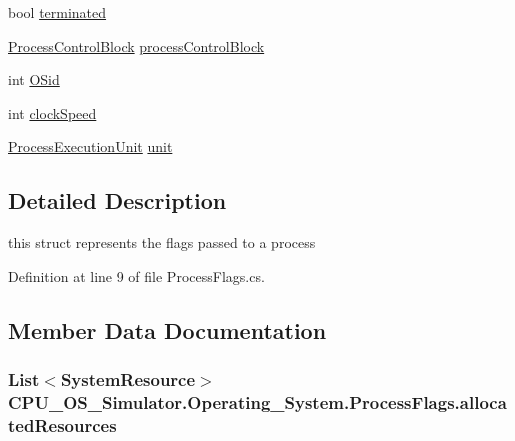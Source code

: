 \begin{DoxyCompactItemize}
\item 
bool \hyperlink{struct_c_p_u___o_s___simulator_1_1_operating___system_1_1_process_flags_a5986a802a1f22f726209aba6d52f7e9c}{terminated}
\item 
\hyperlink{class_c_p_u___o_s___simulator_1_1_operating___system_1_1_process_control_block}{Process\+Control\+Block} \hyperlink{struct_c_p_u___o_s___simulator_1_1_operating___system_1_1_process_flags_adca49f9a3ee1f5e380a7547b0b8b73d6}{process\+Control\+Block}
\item 
int \hyperlink{struct_c_p_u___o_s___simulator_1_1_operating___system_1_1_process_flags_a819f86c160d64c6f4cbba56418cb688e}{O\+Sid}
\item 
int \hyperlink{struct_c_p_u___o_s___simulator_1_1_operating___system_1_1_process_flags_a28dbea54b61ff7f12d5dc8c3c40f632d}{clock\+Speed}
\item 
\hyperlink{class_c_p_u___o_s___simulator_1_1_operating___system_1_1_process_execution_unit}{Process\+Execution\+Unit} \hyperlink{struct_c_p_u___o_s___simulator_1_1_operating___system_1_1_process_flags_a6168635b7297d4ede7af0b1fce2e3db6}{unit}
\end{DoxyCompactItemize}


\subsection{Detailed Description}
this struct represents the flags passed to a process 



Definition at line 9 of file Process\+Flags.\+cs.



\subsection{Member Data Documentation}
\hypertarget{struct_c_p_u___o_s___simulator_1_1_operating___system_1_1_process_flags_a88a701561b9d77841b6b5db19157a30f}{}
\subsubsection[{allocated\+Resources}]{\setlength{\rightskip}{0pt plus 5cm}List$<${\bf System\+Resource}$>$ C\+P\+U\+\_\+\+O\+S\+\_\+\+Simulator.\+Operating\+\_\+\+System.\+Process\+Flags.\+allocated\+Resources}\label{struct_c_p_u___o_s___simulator_1_1_operating___system_1_1_process_flags_a88a701561b9d77841b6b5db19157a30f}


